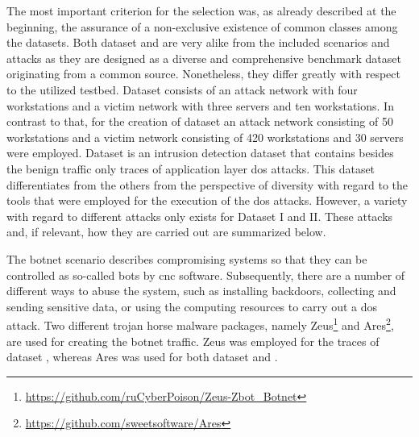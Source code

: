 \documentclass[../../main.tex]{subfiles}
\begin{document}
The most important criterion for the selection was, as already described at the beginning, the assurance of a non-exclusive existence of common classes among the datasets. Both dataset  and  are very alike from the included scenarios and attacks as they are designed as a diverse and comprehensive benchmark dataset originating from a common source. Nonetheless, they differ greatly with respect to the utilized testbed. Dataset  consists of an attack network with four workstations and a victim network with three servers and ten workstations. In contrast to that, for the creation of dataset  an attack network consisting of 50 workstations and a victim network consisting of 420 workstations and 30 servers were employed. Dataset  is an intrusion detection dataset that contains besides the benign traffic only traces of application layer \gls{dos} attacks. This dataset differentiates from the others from the perspective of diversity with regard to the tools that were employed for the execution of the \gls{dos} attacks. However, a variety with regard to different attacks only exists for Dataset I and II. These attacks and, if relevant, how they are carried out are summarized below. 

The botnet scenario describes compromising systems so that they can be controlled as so-called bots by \gls{cnc} software. Subsequently, there are a number of different ways to abuse the system, such as installing backdoors, collecting and sending sensitive data, or using the computing resources to carry out a \gls{dos} attack. Two different trojan horse malware packages, namely Zeus\footnote{\url{https://github.com/ruCyberPoison/Zeus-Zbot_Botnet}} and Ares\footnote{\url{https://github.com/sweetsoftware/Ares}}, are used for creating the botnet traffic. Zeus was employed for the traces of dataset , whereas Ares was used for both dataset  and .
\end{document}

